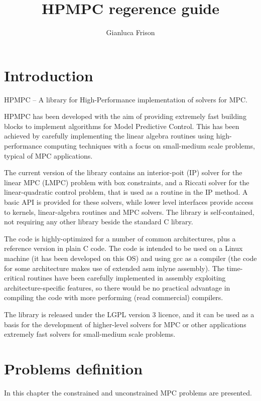 \documentclass[a4paper]{report}
\title{HPMPC regerence guide}
\author{Gianluca Frison}
\begin{document}
\maketitle
\tableofcontents

\chapter{Introduction}

HPMPC -- A library for High-Performance implementation of solvers for MPC.

HPMPC has been developed with the aim of providing extremely fast building blocks to implement algorithms for Model Predictive Control. 
This has been achieved by carefully implementing the linear algebra routines using high-performance computing techniques with a focus on small-medium scale problems, typical of MPC applications.

The current version of the library contains an interior-poit (IP) solver for the linear MPC (LMPC) problem with box constraints, and a Riccati solver for the linear-quadratic control problem, that is used as a routine in the IP method.
A basic API is provided for these solvers, while lower level interfaces provide access to kernels, linear-algebra routines and MPC solvers.
The library is self-contained, not requiring any other library beside the standard C library.

The code is highly-optimized for a number of common architectures, plus a reference version in plain C code.
The code is intended to be used on a Linux machine (it has been developed on this OS) and using gcc as a compiler (the code for some architecture makes use of extended asm inlyne assembly).
The time-critical routines have been carefully implemented in assembly exploiting architecture-specific features, so there would be no practical advantage in compiling the code with more performing (read commercial) compilers.

The library is released under the LGPL version 3 licence, and it can be used as a basis for the development of higher-level solvers for MPC or other applications extremely fast solvers for small-medium scale problems.



\chapter{Problems definition}

In this chapter the constrained and unconstrained MPC problems are presented.
\end{document}
